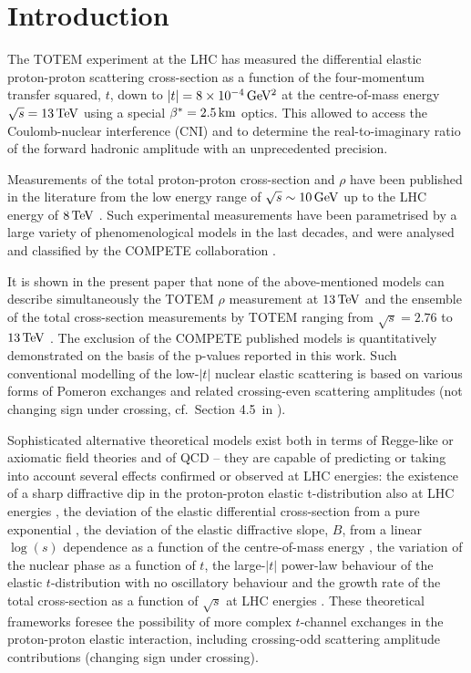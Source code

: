 \section{Introduction}
\label{sec:introduction}

The TOTEM experiment at the LHC has measured the differential elastic proton-proton scattering cross-section as a function of the four-momentum transfer squared, $t$, down to $|t| = 8\times10^{-4}\,{\rm GeV^2}$ at the centre-of-mass energy $\sqrt s = 13\,{\rm TeV}$ using a special $\beta^* = 2.5\,{\rm km}$ optics. This allowed to access the Coulomb-nuclear interference (CNI) and to determine the real-to-imaginary ratio of the forward hadronic amplitude with an unprecedented precision.

Measurements of the total proton-proton cross-section and $\rho$ have been published in the literature from the low energy range of $\sqrt s \sim 10\,{\rm GeV}$ up to the LHC energy of $8\,{\rm TeV}$ \cite{pdg-2016}. Such experimental measurements have been parametrised by a large variety of phenomenological models in the last decades, and were analysed and classified by the COMPETE collaboration \cite{compete}.

It is shown in the present paper that none of the above-mentioned models can describe simultaneously the TOTEM $\rho$ measurement at $13\,{\rm TeV}$ and the ensemble of the total cross-section measurements by TOTEM ranging from $\sqrt s = 2.76$ to $13\,{\rm TeV}$ \cite{totem-7tev-tot2,totem-8tev-90m,totem-8tev-1km,totem-13tev-90m}. The exclusion of the COMPETE published models is quantitatively demonstrated on the basis of the p-values reported in this work. Such conventional modelling of the low-$|t|$ nuclear elastic scattering is based on various forms of Pomeron exchanges and related crossing-even scattering amplitudes (not changing sign under crossing, cf.~Section 4.5~in \cite{barone-predazzi}).

Sophisticated alternative theoretical models exist both in terms of Regge-like or axiomatic field theories \cite{nicolescu-1992} and of QCD \cite{bartels-1980,kwiecinski-1980,jaroszewicz-1981} -- they are capable of predicting or taking into account several effects confirmed or observed at LHC energies: the existence of a sharp diffractive dip in the proton-proton elastic t-distribution also at LHC energies \cite{totem-7tev-first}, the deviation of the elastic differential cross-section from a pure exponential \cite{totem-8tev-90m}, the deviation of the elastic diffractive slope, $B$, from a linear $\log(s)$ dependence as a function of the centre-of-mass energy \cite{totem-13tev-90m}, the variation of the nuclear phase as a function of $t$, the large-$|t|$ power-law behaviour of the elastic $t$-distribution with no oscillatory behaviour and the growth rate of the total cross-section as a function of $\sqrt s$ at LHC energies \cite{totem-13tev-90m}. These theoretical frameworks foresee the possibility of more complex $t$-channel exchanges in the proton-proton elastic interaction, including crossing-odd scattering amplitude contributions (changing sign under crossing).

